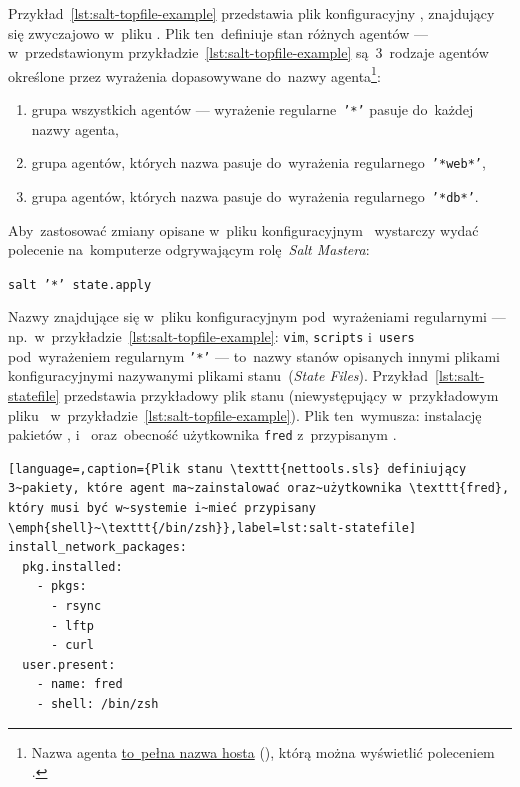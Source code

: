 \documentclass[thesis]{subfiles}
\begin{document}
Przykład~\ref{lst:salt-topfile-example} przedstawia plik konfiguracyjny , znajdujący się zwyczajowo w~pliku . Plik ten~definiuje stan różnych agentów --- w~przedstawionym przykładzie~\ref{lst:salt-topfile-example} są~3~rodzaje agentów określone przez wyrażenia dopasowywane do~nazwy agenta\footnote{Nazwa agenta \href{https://docs.saltstack.com/en/latest/topics/tutorials/walkthrough.html\#minion-id-generation}{to~pełna nazwa hosta} (), którą można wyświetlić poleceniem .}:\mynobreakpar
\begin{enumerate}
	\item grupa wszystkich agentów --- wyrażenie regularne~\texttt{'*'} pasuje do~każdej nazwy agenta,
	\item grupa agentów, których nazwa pasuje do~wyrażenia regularnego~\texttt{'*web*'},
	\item grupa agentów, których nazwa pasuje do~wyrażenia regularnego~\texttt{'*db*'}.
\end{enumerate}
Aby~zastosować zmiany opisane w~pliku konfiguracyjnym~ wystarczy wydać polecenie na~komputerze odgrywającym rolę~\emph{Salt Mastera}:\mynobreakpar
\begin{center}
	\texttt{salt '*' state.apply}
\end{center}

Nazwy znajdujące się w~pliku konfiguracyjnym pod~wyrażeniami regularnymi --- np.~w~przykładzie~\ref{lst:salt-topfile-example}: \texttt{vim}, \texttt{scripts} i~\texttt{users} pod~wyrażeniem regularnym \texttt{'*'} --- to~nazwy stanów opisanych innymi plikami konfiguracyjnymi nazywanymi plikami stanu~(\emph{State Files}). Przykład~\ref{lst:salt-statefile} przedstawia przykładowy plik stanu  (niewystępujący w~przykładowym pliku~ w~przykładzie~\ref{lst:salt-topfile-example}). Plik ten~wymusza: instalację pakietów ,  i~ oraz~obecność użytkownika \texttt{fred} z~przypisanym  \href{https://en.wikipedia.org/wiki/Z_shell}{}.

\begin{lstlisting}[language=,caption={Plik stanu \texttt{nettools.sls} definiujący 3~pakiety, które agent ma~zainstalować oraz~użytkownika \texttt{fred}, który musi być w~systemie i~mieć przypisany \emph{shell}~\texttt{/bin/zsh}},label=lst:salt-statefile]
install_network_packages:
  pkg.installed:
    - pkgs:
      - rsync
      - lftp
      - curl
  user.present:
    - name: fred
    - shell: /bin/zsh
\end{lstlisting}
\end{document}
